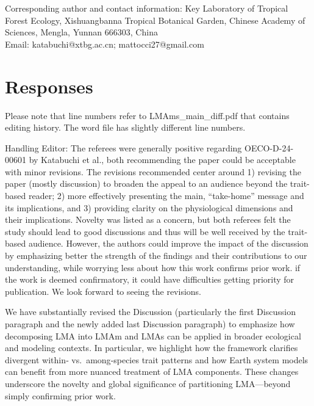 \documentclass[
  12pt,
  letterpaper,
  DIV=11,
  numbers=noendperiod]{scrartcl}
\renewenvironment{quote}
  {\begin{customblockquote}\color{blockquote-text}\ignorespaces}
  {\end{customblockquote}}
\begin{document}
Corresponding author and contact information: Key Laboratory of Tropical
Forest Ecology, Xishuangbanna Tropical Botanical Garden, Chinese Academy
of Sciences, Mengla, Yunnan 666303, China\\
Email: katabuchi@xtbg.ac.cn; mattocci27@gmail.com

\newpage

\section{Responses}\label{responses}

Please note that line numbers refer to LMAms\_main\_diff.pdf that
contains editing history. The word file has slightly different line
numbers.

\begin{quote}
Handling Editor: The referees were generally positive regarding
OECO-D-24-00601 by Katabuchi et al., both recommending the paper could
be acceptable with minor revisions. The revisions recommended center
around 1) revising the paper (mostly discussion) to broaden the appeal
to an audience beyond the trait-based reader; 2) more effectively
presenting the main, ``take-home'' message and its implications, and 3)
providing clarity on the physiological dimensions and their
implications. Novelty was listed as a concern, but both referees felt
the study should lead to good discussions and thus will be well received
by the trait-based audience. However, the authors could improve the
impact of the discussion by emphasizing better the strength of the
findings and their contributions to our understanding, while worrying
less about how this work confirms prior work. if the work is deemed
confirmatory, it could have difficulties getting priority for
publication. We look forward to seeing the revisions.
\end{quote}

We have substantially revised the Discussion (particularly the first
Discussion paragraph and the newly added last Discussion paragraph) to
emphasize how decomposing LMA into LMAm and LMAs can be applied in
broader ecological and modeling contexts. In particular, we highlight
how the framework clarifies divergent within‐ vs.~among‐species trait
patterns and how Earth system models can benefit from more nuanced
treatment of LMA components. These changes underscore the novelty and
global significance of partitioning LMA---beyond simply confirming prior
work.
\end{document}
